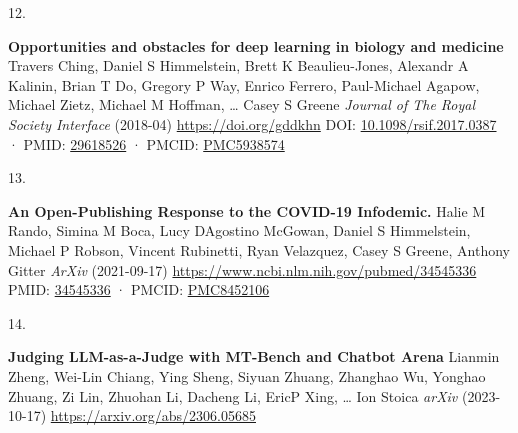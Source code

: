 \documentclass[
]{article}
\newlength{\cslhangindent}
\newlength{\csllabelwidth}
\newlength{\cslentryspacingunit} %
\newenvironment{CSLReferences}[2] %
 {%
  \setlength{\parindent}{0pt}
  \ifodd #1
  \let\oldpar\par
  \def\par{\hangindent=\cslhangindent\oldpar}
  \fi
  \setlength{\parskip}{#2\cslentryspacingunit}
 }%
 {}
\newcommand{\CSLBlock}[1]{#1\hfill\break}
\newcommand{\CSLLeftMargin}[1]{\parbox[t]{\csllabelwidth}{#1}}
\newcommand{\CSLRightInline}[1]{\parbox[t]{\linewidth - \csllabelwidth}{#1}\break}
\providecommand{\DIFaddbegin}{} %
\providecommand{\DIFaddend}{} %
\providecommand{\DIFdelbegin}{} %
\providecommand{\DIFdelend}{} %
\newcommand{\DIFscaledelfig}{0.5}
\newlength{\DIFdelgraphicswidth} %
\newlength{\DIFdelgraphicsheight} %
\newcommand{\DIFaddincludegraphics}[2][]{{\color{blue}\fbox{\DIFOincludegraphics[#1]{#2}}}} %
\newcommand{\DIFdelincludegraphics}[2][]{%
\sbox{\DIFdelgraphicsbox}{\DIFOincludegraphics[#1]{#2}}%
\settoboxwidth{\DIFdelgraphicswidth}{\DIFdelgraphicsbox} %
\settoboxtotalheight{\DIFdelgraphicsheight}{\DIFdelgraphicsbox} %
\scalebox{\DIFscaledelfig}{%
\parbox[b]{\DIFdelgraphicswidth}{\usebox{\DIFdelgraphicsbox}\\[-\baselineskip] \rule{\DIFdelgraphicswidth}{0em}}\llap{\resizebox{\DIFdelgraphicswidth}{\DIFdelgraphicsheight}{%
\setlength{\unitlength}{\DIFdelgraphicswidth}%
\begin{picture}(1,1)%
\thicklines\linethickness{2pt} %
{\color[rgb]{1,0,0}\put(0,0){\framebox(1,1){}}}%
{\color[rgb]{1,0,0}\put(0,0){\line( 1,1){1}}}%
{\color[rgb]{1,0,0}\put(0,1){\line(1,-1){1}}}%
\end{picture}%
}\hspace*{3pt}}} %
} %
\DeclareRobustCommand{\DIFaddbegin}{\DIFOaddbegin \let\includegraphics\DIFaddincludegraphics} %
\DeclareRobustCommand{\DIFaddend}{\DIFOaddend \let\includegraphics\DIFOincludegraphics} %
\DeclareRobustCommand{\DIFdelbegin}{\DIFOdelbegin \let\includegraphics\DIFdelincludegraphics} %
\DeclareRobustCommand{\DIFdelend}{\DIFOaddend \let\includegraphics\DIFOincludegraphics} %
\begin{document}
\begin{CSLReferences}{0}{0}
\leavevmode{}%
\CSLLeftMargin{12. }%
\CSLRightInline{\textbf{Opportunities and obstacles for deep learning in biology and medicine}
\CSLBlock{Travers Ching, Daniel S Himmelstein, Brett K Beaulieu-Jones, Alexandr A Kalinin, Brian T Do, Gregory P Way, Enrico Ferrero, Paul-Michael Agapow, Michael Zietz, Michael M Hoffman, \ldots{} Casey S Greene} \emph{Journal of The Royal Society Interface} (2018-04) \url{https://doi.org/gddkhn}
\CSLBlock{DOI: \href{https://doi.org/10.1098/rsif.2017.0387}{10.1098/rsif.2017.0387} · PMID: \href{https://www.ncbi.nlm.nih.gov/pubmed/29618526}{29618526} · PMCID: \href{https://www.ncbi.nlm.nih.gov/pmc/articles/PMC5938574}{PMC5938574}}}

\leavevmode{}%
\CSLLeftMargin{13. }%
\CSLRightInline{\textbf{An Open-Publishing Response to the COVID-19 Infodemic.}
\CSLBlock{Halie M Rando, Simina M Boca, Lucy D\textquotesingle Agostino McGowan, Daniel S Himmelstein, Michael P Robson, Vincent Rubinetti, Ryan Velazquez, Casey S Greene, Anthony Gitter} \emph{ArXiv} (2021-09-17) \url{https://www.ncbi.nlm.nih.gov/pubmed/34545336}
\CSLBlock{PMID: \href{https://www.ncbi.nlm.nih.gov/pubmed/34545336}{34545336} · PMCID: \href{https://www.ncbi.nlm.nih.gov/pmc/articles/PMC8452106}{PMC8452106}}}

\leavevmode\vadjust pre{\DIFdelbegin %
\DIFdelend \DIFaddbegin \hypertarget{ref-LhEwBH2w}{}\DIFaddend }%
\CSLLeftMargin{14. }%
\DIFdelbegin %
\DIFdelend \DIFaddbegin \CSLRightInline{\textbf{Judging LLM-as-a-Judge with MT-Bench and Chatbot Arena}
\CSLBlock{Lianmin Zheng, Wei-Lin Chiang, Ying Sheng, Siyuan Zhuang, Zhanghao Wu, Yonghao Zhuang, Zi Lin, Zhuohan Li, Dacheng Li, EricP Xing, \ldots{} Ion Stoica} \emph{arXiv} (2023-10-17) \url{https://arxiv.org/abs/2306.05685}}
\DIFaddend 


\end{CSLReferences}
\end{document}
